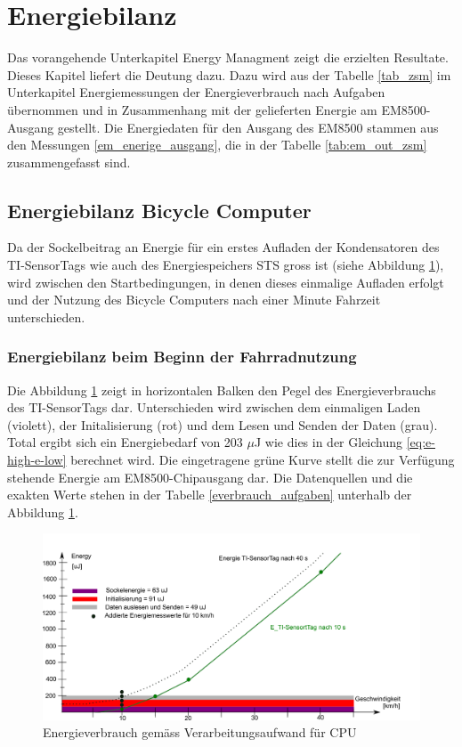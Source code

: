 \section{Energiebilanz}
\label{energiBilanz}
Das vorangehende Unterkapitel Energy Managment zeigt die erzielten Resultate. Dieses Kapitel liefert die Deutung dazu. Dazu wird aus der Tabelle \ref{tab_zsm} im Unterkapitel Energiemessungen der Energieverbrauch nach Aufgaben übernommen und in Zusammenhang mit der gelieferten Energie am EM8500-Ausgang gestellt. Die Energiedaten für den Ausgang des EM8500 stammen aus den Messungen \ref{em_enerige_ausgang}, die in der Tabelle \ref{tab:em_out_zsm} zusammengefasst sind.

\subsection{Energiebilanz Bicycle Computer}

Da der Sockelbeitrag an Energie für ein erstes Aufladen der Kondensatoren des TI-SensorTags wie auch des Energiespeichers STS gross ist (siehe  Abbildung \ref{r_bild_e_zusammenfassung}), wird zwischen den Startbedingungen, in denen dieses einmalige Aufladen erfolgt und der Nutzung des Bicycle Computers nach einer Minute Fahrzeit unterschieden.


\subsubsection*{Energiebilanz beim Beginn der Fahrradnutzung}

Die Abbildung \ref{r_bild_e_zusammenfassung} zeigt in horizontalen Balken den Pegel des Energieverbrauchs des TI-SensorTags dar. Unterschieden wird zwischen dem einmaligen Laden (violett), der Initalisierung (rot) und dem Lesen und Senden der Daten (grau). Total ergibt sich ein Energiebedarf von 203 $\mu$J wie dies in der Gleichung \ref{eq:e-high-e-low} berechnet wird. Die eingetragene grüne Kurve stellt die zur Verfügung stehende Energie am EM8500-Chipausgang dar. Die Datenquellen und die exakten Werte stehen in der Tabelle \ref{everbrauch_aufgaben} unterhalb der Abbildung \ref{r_bild_e_zusammenfassung}.

\begin{figure}[ht]
     \includegraphics[width=1\textwidth]{4Resultate/imag/EnergyVerbrauchZusammenfassung.png}
     \caption{Energieverbrauch gem\"{a}ss Verarbeitungsaufwand für CPU}
     \label{r_bild_e_zusammenfassung}
\end{figure}


